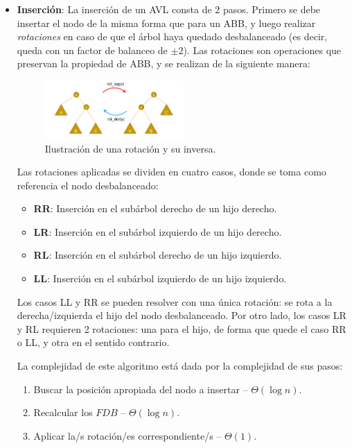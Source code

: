 \documentclass{article}
\newcommand{\BigTheta}[1]{{\Theta(#1)}}
\begin{document}
\begin{itemize}
    \item \textbf{Inserción}: La inserción de un AVL consta de 2 pasos. Primero se debe insertar el nodo de la misma forma que para un ABB, y luego realizar \textit{rotaciones} en caso de que el árbol haya quedado desbalanceado (es decir, queda con un factor de balanceo de $\pm 2$). Las rotaciones son operaciones que preservan la propiedad de ABB, y se realizan de la siguiente manera:
          \begin{figure}[H]
              \centering
              \includegraphics*[width=0.5\textwidth]{AVL_rotation.png}
              \caption*{Ilustración de una rotación y su inversa.}
          \end{figure}

          Las rotaciones aplicadas se dividen en cuatro casos, donde se toma como referencia el nodo desbalanceado:
          \begin{itemize}
              \item \textbf{RR}: Inserción en el subárbol derecho de un hijo derecho.
              \item \textbf{LR}: Inserción en el subárbol izquierdo de un hijo derecho.
              \item \textbf{RL}: Inserción en el subárbol derecho de un hijo izquierdo.
              \item \textbf{LL}: Inserción en el subárbol izquierdo de un hijo izquierdo.
          \end{itemize}

          Los casos LL y RR se pueden resolver con una única rotación: se rota a la derecha/izquierda el hijo del nodo desbalanceado. Por otro lado, los casos LR y RL requieren 2 rotaciones: una para el hijo, de forma que quede el caso RR o LL, y otra en el sentido contrario.

          La complejidad de este algoritmo está dada por la complejidad de sus pasos:
          \begin{enumerate}
              \item Buscar la posición apropiada del nodo a insertar -- $\BigTheta{\log{n}}$.
              \item Recalcular los $FDB$ -- $\BigTheta{\log{n}}$.
              \item Aplicar la/s rotación/es correspondiente/s -- $\BigTheta{1}$.
          \end{enumerate}


\end{itemize}
\end{document}

